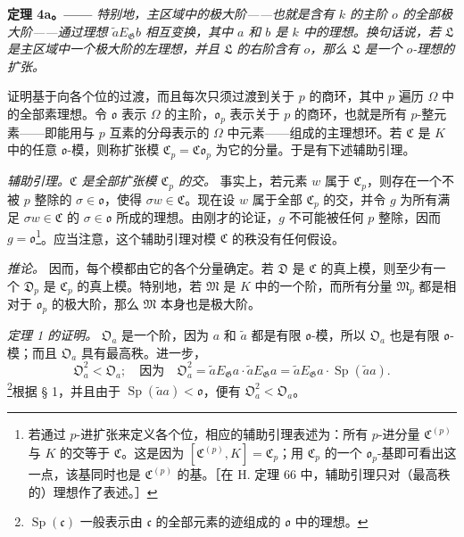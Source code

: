 \documentclass[11pt]{article}
\providecommand{\Gg}{\mathfrak G}
\providecommand{\oo}{\mathfrak o}
\providecommand{\Sp}{\operatorname{Sp}}
\begin{document}
\medskip
\noindent\textbf{定理 4a。——} \emph{特别地，主区域中的极大阶——也就是含有 \(k\) 的主阶 \(o\) 的全部极大阶——通过理想 \(\widetilde aE_\Gg b\) 相互变换，其中 \(a\) 和 \(b\) 是 \(k\) 中的理想。换句话说，若 \(\mathfrak L\) 是主区域中一个极大阶的左理想，并且 \(\mathfrak L\) 的右阶含有 \(o\)，那么 \(\mathfrak L\) 是一个 \(o\)-理想的扩张。}

证明基于向各个位的过渡，而且每次只须过渡到关于 \(p\) 的商环，其中 \(p\) 遍历 \(\Omega\) 中的全部素理想。令 \(\oo\) 表示 \(\Omega\) 的主阶，\(\oo_p\) 表示关于 \(p\) 的商环，也就是所有 \(p\)-整元素——即能用与 \(p\) 互素的分母表示的 \(\Omega\) 中元素——组成的主理想环。若 \(\mathfrak C\) 是 \(K\) 中的任意 \(\oo\)-模，则称扩张模 \(\mathfrak C_p=\mathfrak C\oo_p\) 为它的分量。于是有下述辅助引理。

\medskip
\noindent\emph{辅助引理。\(\mathfrak C\) 是全部扩张模 \(\mathfrak C_p\) 的交。} 事实上，若元素 \(w\) 属于 \(\mathfrak C_p\)，则存在一个不被 \(p\) 整除的 \(\sigma\in\oo\)，使得 \(\sigma w\in\mathfrak C\)。现在设 \(w\) 属于全部 \(\mathfrak C_p\) 的交，并令 \(g\) 为所有满足 \(\sigma w\in\mathfrak C\) 的 \(\sigma\in\oo\) 所成的理想。由刚才的论证，\(g\) 不可能被任何 \(p\) 整除，因而 \(g=\oo\)\footnote{若通过 \(p\)-进扩张来定义各个位，相应的辅助引理表述为：所有 \(p\)-进分量 \(\mathfrak C^{(p)}\) 与 \(K\) 的交等于 \(\mathfrak C\)。这是因为 \([\mathfrak C^{(p)},K]=\mathfrak C_p\)；用 \(\mathfrak C_p\) 的一个 \(\oo_p\)-基即可看出这一点，该基同时也是 \(\mathfrak C^{(p)}\) 的基。［在 H. 定理 66 中，辅助引理只对（最高秩的）理想作了表述。］}。应当注意，这个辅助引理对模 \(\mathfrak C\) 的秩没有任何假设。

\emph{推论。} 因而，每个模都由它的各个分量确定。若 \(\mathfrak D\) 是 \(\mathfrak C\) 的真上模，则至少有一个 \(\mathfrak D_p\) 是 \(\mathfrak C_p\) 的真上模。特别地，若 \(\mathfrak M\) 是 \(K\) 中的一个阶，而所有分量 \(\mathfrak M_p\) 都是相对于 \(\oo_p\) 的极大阶，那么 \(\mathfrak M\) 本身也是极大阶。

\medskip
\noindent\emph{定理 1 的证明。} \(\mathfrak O_a\) 是一个阶，因为 \(a\) 和 \(\widetilde a\) 都是有限 \(\oo\)-模，所以 \(\mathfrak O_a\) 也是有限 \(\oo\)-模；而且 \(\mathfrak O_a\) 具有最高秩。进一步，
\[
\mathfrak O_a^2<\mathfrak O_a;
\quad\text{因为}\quad
\mathfrak O_a^2
 =\widetilde aE_\Gg a\cdot\widetilde aE_\Gg a
 =\widetilde aE_\Gg a\cdot\Sp(\widetilde a a).
\]
\footnote{\(\Sp(\mathfrak c)\) 一般表示由 \(\mathfrak c\) 的全部元素的迹组成的 \(\oo\) 中的理想。}根据 § 1，并且由于 \(\Sp(\widetilde a a)<\oo\)，便有 \(\mathfrak O_a^2<\mathfrak O_a\)。
\end{document}
